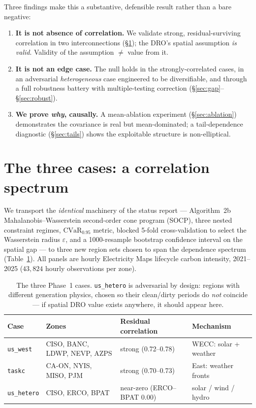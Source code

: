 \documentclass[11pt]{article}
\newcommand{\CVaR}{\mathrm{CVaR}}
\begin{document}
\noindent Three findings make this a substantive, defensible result rather than a
bare negative:
\begin{enumerate}[leftmargin=1.4em,itemsep=2pt]
  \item \textbf{It is not absence of correlation.} We validate strong, residual-surviving
  correlation in two interconnections (\S\ref{sec:cases}); the DRO's spatial assumption
  \emph{is valid}. Validity of the assumption $\neq$ value from it.
  \item \textbf{It is not an edge case.} The null holds in the strongly-correlated cases,
  in an adversarial \emph{heterogeneous} case engineered to be diversifiable, and through
  a full robustness battery with multiple-testing correction (\S\ref{sec:gap}--\S\ref{sec:robust}).
  \item \textbf{We prove \emph{why}, causally.} A mean-ablation experiment
  (\S\ref{sec:ablation}) demonstrates the covariance is real but mean-dominated; a
  tail-dependence diagnostic (\S\ref{sec:tails}) shows the exploitable structure is
  non-elliptical.
\end{enumerate}

\section{The three cases: a correlation spectrum}\label{sec:cases}

We transport the \emph{identical} machinery of the status report --- Algorithm~2b
Mahalanobis--Wasserstein second-order cone program (SOCP), three nested constraint
regimes, $\CVaR_{0.95}$ metric, blocked 5-fold cross-validation to select the
Wasserstein radius $\varepsilon$, and a 1000-resample bootstrap confidence interval
on the spatial gap --- to three new region sets chosen to span the dependence
spectrum (Table~\ref{tab:cases}). All panels are hourly Electricity Maps lifecycle
carbon intensity, 2021--2025 ($43{,}824$ hourly observations per zone).

\begin{table}[h]\centering\small
\begin{tabular}{@{}llll@{}}
\toprule
\textbf{Case} & \textbf{Zones} & \textbf{Residual correlation} & \textbf{Mechanism} \\
\midrule
\texttt{us\_west} & CISO, BANC, LDWP, NEVP, AZPS & strong (0.72--0.78) & WECC: solar + weather \\
\texttt{taskc} & CA-ON, NYIS, MISO, PJM & strong (0.70--0.73) & East: weather fronts \\
\texttt{us\_hetero} & CISO, ERCO, BPAT & near-zero (ERCO--BPAT $0.00$) & solar / wind / hydro \\
\bottomrule
\end{tabular}
\caption{The three Phase~1 cases. \texttt{us\_hetero} is adversarial by design:
regions with different generation physics, chosen so their clean/dirty periods do
\emph{not} coincide --- if spatial DRO value exists anywhere, it should appear here.}
\label{tab:cases}
\end{table}
\end{document}
